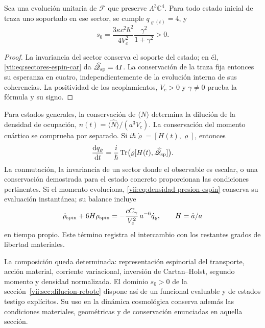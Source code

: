\begin{corollary}
\label{vii:cor:dominio-positivo-conservado}
Sea una evolución unitaria de \(\mathcal F\) que preserve
\(\Lambda^3\mathbb C^4\). Para todo estado inicial de traza uno
soportado en ese sector, se cumple \(q_{\varrho(t)}=4\), y
\begin{equation}
 s_0=\frac{3\kappa c^2\hbar^2}{4V_c^2}
                   \frac{\gamma^2}{1+\gamma^2}>0.
 \label{vii:eq:amplitud-positiva-sector-tres}
\end{equation}
\end{corollary}
\begin{proof}
La invariancia del sector conserva el soporte del estado; en él,
\eqref{vii:eq:sectores-espin-car} da
\(\widehat{\mathscr Q}_{\rm sp}=4I\). La conservación de la
traza fija entonces su esperanza en cuatro, independientemente de
la evolución interna de sus coherencias. La positividad de los
acoplamientos, \(V_c>0\) y \(\gamma\ne0\) prueba la fórmula
y su signo.
\end{proof}

Para estados generales, la conservación de
\(\langle\widehat N\rangle\) determina la dilución de la densidad
de ocupación, \(n(t)=\langle\widehat N\rangle/(a^3V_c)\).
La conservación del momento cuártico se comprueba por separado.
Si \(i\hbar\dot\varrho=[H(t),\varrho]\), entonces
\begin{equation}
 \frac{\mathrm d q_\varrho}{\mathrm dt}
 =\frac{i}{\hbar}\operatorname{Tr}
       \bigl(\varrho[H(t),\widehat{\mathscr Q}_{\rm sp}]\bigr).
 \label{vii:eq:conservacion-momento-cuartico}
\end{equation}
La conmutación, la invariancia de un sector donde el observable es
escalar, o una conservación demostrada para el estado concreto
proporcionan las condiciones pertinentes. Si el momento evoluciona,
\eqref{vii:eq:densidad-presion-espin} conserva su evaluación
instantánea; su balance incluye
\[
 \dot\rho_{\rm spin}+6H\rho_{\rm spin}
 =-\frac{cC_\gamma}{V_c^2}\,a^{-6}\dot q_\varrho,
 \qquad H=\dot a/a
\]
en tiempo propio. Este término registra el intercambio con los
restantes grados de libertad materiales.

La composición queda determinada: representación espinorial del
transporte, acción material, corriente variacional, inversión de
Cartan--Holst, segundo momento y densidad normalizada. El dominio
\(s_0>0\) de la sección~\ref{vii:sec:dilucion-rebote} dispone así
de un funcional evaluable y de estados testigo explícitos. Su uso en
la dinámica cosmológica conserva además las condiciones materiales,
geométricas y de conservación enunciadas en aquella sección.
